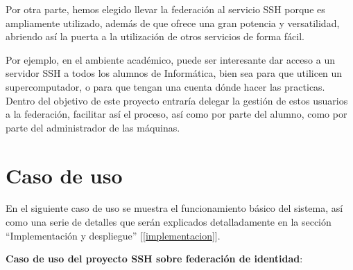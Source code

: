 Por otra parte, hemos elegido llevar la federación al servicio SSH
porque es ampliamente utilizado, además de que ofrece una gran
potencia y versatilidad, abriendo así la puerta a la utilización de
otros servicios de forma fácil.

Por ejemplo, en el ambiente académico, puede ser interesante dar
acceso a un servidor SSH a todos los alumnos de Informática, bien sea
para que utilicen un supercomputador, o para que tengan una cuenta
dónde hacer las practicas. Dentro del objetivo de este proyecto
entraría delegar la gestión de estos usuarios a la federación,
facilitar así el proceso, así como por parte del alumno, como por
parte del administrador de las máquinas.

\section{Caso de uso}

    En el siguiente caso de uso se muestra el funcionamiento básico del
    sistema, así como una serie de detalles que serán explicados
    detalladamente en la sección ``Implementación y despliegue''
    [\ref{implementacion}].

    \textbf{Caso de uso del proyecto SSH sobre federación de identidad}:

